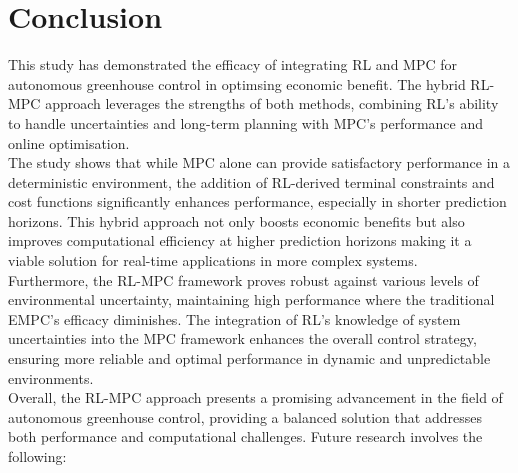 \section{Conclusion}

This study has demonstrated the efficacy of integrating RL and MPC for autonomous greenhouse control in optimsing economic benefit. The hybrid RL-MPC approach leverages the strengths of both methods, combining RL's ability to handle uncertainties and long-term planning with MPC's performance and online optimisation.\\
The study shows that while MPC alone can provide satisfactory performance in a deterministic environment, the addition of RL-derived terminal constraints and cost functions significantly enhances performance, especially in shorter prediction horizons. This hybrid approach not only boosts economic benefits but also improves computational efficiency at higher prediction horizons making it a viable solution for real-time applications in more complex systems.\\
Furthermore, the RL-MPC framework proves robust against various levels of environmental uncertainty, maintaining high performance where the traditional EMPC's efficacy diminishes. The integration of RL's knowledge of system uncertainties into the MPC framework enhances the overall control strategy, ensuring more reliable and optimal performance in dynamic and unpredictable environments.\\
Overall, the RL-MPC approach presents a promising advancement in the field of autonomous greenhouse control, providing a balanced solution that addresses both performance and computational challenges. Future research involves the following:

